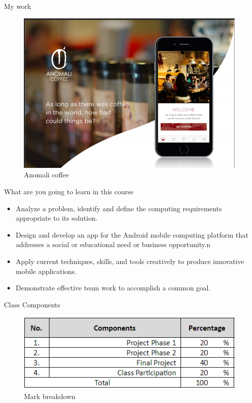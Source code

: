 \documentclass{beamer}
\begin{document}
   \begin{frame}{My work}
	\begin{center}
		\begin{figure}
		\includegraphics[scale=0.3]{images/anomali.png}
		\caption{Anomali coffee}
		\end{figure}
	\end{center}
  \end{frame}
  
  

  
  
  
    
   \begin{frame}{What are you going to learn in this course}
  	\begin{itemize}
		\item 	Analyze a problem, identify and define the computing requirements appropriate to its solution.
		\item Design and develop an app for the Android mobile computing platform that addresses a social or educational need or business opportunity.n
		\item Apply current techniques, skills, and tools creatively to produce innovative mobile applications.
		\item Demonstrate effective team work to accomplish a common goal.
	\end{itemize}
  \end{frame}
  
  
   \begin{frame}{Class Components}
	\begin{center}
		\begin{figure}
		\includegraphics[scale=0.6]{images/class-components.png}
		\caption{Mark breakdown}
		\end{figure}
	\end{center}
  \end{frame}
  
\end{document}
